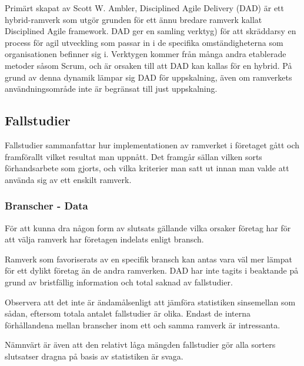 		Primärt skapat av Scott W. Ambler, Disciplined Agile Delivery (DAD) är ett hybrid-ramverk som utgör grunden för ett ännu bredare ramverk kallat Disciplined Agile framework. DAD ger en samling verktyg) för att skräddarsy en process för agil utveckling som passar in i de specifika omständigheterna som organisationen befinner sig i. Verktygen kommer från många andra etablerade metoder såsom Scrum, och är orsaken till att DAD kan kallas för en hybrid. På grund av denna dynamik lämpar sig DAD för uppskalning, även om ramverkets användningsområde inte är begränsat till just uppskalning.
		
		
		
			
	
	\subsection{Fallstudier}

		Fallstudier sammanfattar hur implementationen av ramverket i företaget gått och framförallt vilket resultat man uppnått. Det framgår sällan vilken sorts förhandsarbete som gjorts, och vilka kriterier man satt ut innan man valde att använda sig av ett enskilt ramverk.
		
		\subsubsection{Branscher - Data}
			
			För att kunna dra någon form av slutsats gällande vilka orsaker företag har för att välja ramverk har företagen indelats enligt bransch.
					
			Ramverk som favoriserats av en specifik bransch kan antas vara väl mer lämpat för ett dylikt företag än de andra ramverken. DAD har inte tagits i beaktande på grund av bristfällig information och total saknad av fallstudier.
			
			Observera att det inte är ändamålsenligt att jämföra statistiken sinsemellan som sådan, eftersom totala antalet fallstudier är olika. Endast de interna förhållandena mellan branscher inom ett och samma ramverk är intressanta.
				
			Nämnvärt är även att den relativt låga mängden fallstudier gör alla sorters slutsatser dragna på basis av statistiken är svaga.
			
